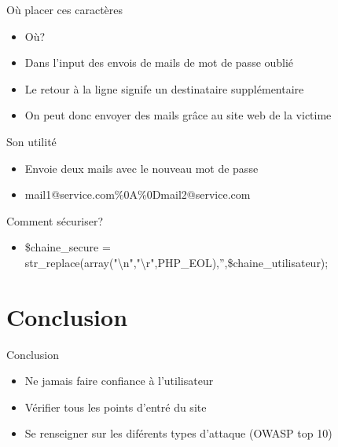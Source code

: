 \documentclass{beamer}
\begin{document}
\begin{frame}{Où placer ces caractères}
	\begin{itemize}
		\item Où?
		\item Dans l'input des envois de mails de mot de passe oublié
		\item Le retour à la ligne signife un destinataire supplémentaire
		\item On peut donc envoyer des mails grâce au site web de la victime
	\end{itemize}
\end{frame}

\begin{frame}{Son utilité}
	\begin{itemize}
		\item Envoie deux mails avec le nouveau mot de passe
		\item mail1@service.com\%0A\%0Dmail2@service.com
	\end{itemize}
\end{frame}

\begin{frame}{Comment sécuriser?}
	\begin{itemize}
		\item \$chaine\_secure = str\_replace(array("\textbackslash n","\textbackslash r",PHP\_EOL),'',\$chaine\_utilisateur);	
	\end{itemize}
\end{frame}

\section{Conclusion}

\begin{frame}{Conclusion}
	\begin{itemize}
		\item Ne jamais faire confiance à l'utilisateur
		\item Vérifier tous les points d'entré du site
		\item Se renseigner sur les diférents types d'attaque (OWASP top 10)
	\end{itemize}
\end{frame}
\end{document}
